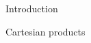 \documentclass[12pt]{amsart}
\theoremstyle{definition}
\def\cart{\, \Box \,}
\begin{document}
\begin{section}{Introduction}
\begin{section}{Cartesian products}
%
%
%
%
%
%
%
%
%
%
%
%
%

\end{section}
\end{section}
\end{document}
